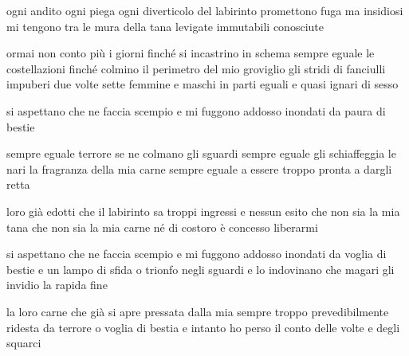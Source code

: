 \begin{poem}
	\begin{stanza}
		ogni andito\verseline
		ogni piega\verseline
		ogni diverticolo\verseline
		del labirinto\verseline
		promettono fuga\verseline
		ma insidiosi mi tengono\verseline
		tra le mura della tana\verseline
		levigate\verseline
		immutabili\verseline
		conosciute
	\end{stanza}

	\begin{stanza}
		ormai non conto più i giorni\verseline
		finché si incastrino in schema\verseline
		sempre eguale le costellazioni\verseline
		finché colmino il perimetro\verseline
		del mio groviglio\verseline
		gli stridi di fanciulli impuberi\verseline
		due volte sette\verseline
		femmine e maschi in parti eguali\verseline
		e quasi\verseline
		ignari di sesso
	\end{stanza}

	\begin{stanza}
		si aspettano che ne faccia scempio\verseline
		e mi fuggono addosso\verseline
		inondati da paura di bestie
	\end{stanza}

	\begin{stanza}
		sempre eguale terrore\verseline
		se ne colmano gli sguardi\verseline
		sempre eguale\verseline
		gli schiaffeggia le nari\verseline
		la fragranza della mia carne\verseline
		sempre eguale a essere\verseline
		troppo pronta a dargli retta
	\end{stanza}

	\begin{stanza}
		loro già edotti che il labirinto\verseline
		sa troppi ingressi e nessun esito\verseline
		che non sia la mia tana\verseline
		che non sia la mia carne\verseline
		né di costoro è concesso liberarmi
	\end{stanza}

	\begin{stanza}
		si aspettano che ne faccia scempio\verseline
		e mi fuggono addosso\verseline
		inondati da voglia di bestie\verseline
		e un lampo di sfida o trionfo\verseline
		negli sguardi e lo indovinano\verseline
		che magari gli invidio\verseline
		la rapida fine
	\end{stanza}

	\begin{stanza}
		la loro carne che già si apre\verseline
		pressata dalla mia sempre\verseline
		troppo prevedibilmente ridesta\verseline
		da terrore o voglia di bestia\verseline
		e intanto ho perso il conto\verseline
		delle volte e degli squarci
	\end{stanza}


\end{poem}
